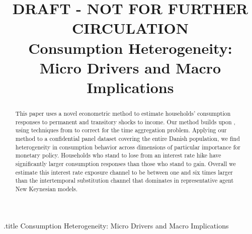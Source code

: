 \documentclass[titlepage]{\econtex}\newcommand{\texname}{ConsumptionHeterogeneity}
\begin{document}




\begin{verbatimwrite}{\jobname.title}
Consumption Heterogeneity: Micro Drivers and Macro Implications
\end{verbatimwrite}

\hfill{\tiny \jobname}

\title{DRAFT - NOT FOR FURTHER CIRCULATION\\ 
	\bigskip
	\bigskip
	Consumption Heterogeneity: \\ Micro Drivers and Macro Implications}



\maketitle

\begin{abstract}
    This paper uses a novel econometric method to estimate households' consumption responses to permanent and transitory shocks to income. Our method builds upon \cite{blundell_consumption_2008}, using techniques from \cite{crawley_time_2018} to correct for the time aggregation problem. Applying our method to a confidential panel dataset covering the entire Danish population, we find heterogeneity in consumption behavior across dimensions of particular importance for monetary policy. Households who stand to lose from an interest rate hike have significantly larger consumption responses than those who stand to gain. Overall we estimate this interest rate exposure channel to be between one and six times larger than the intertemporal substitution channel that dominates in representative agent New Keynesian models.
%  
\end{abstract}
\end{document}
